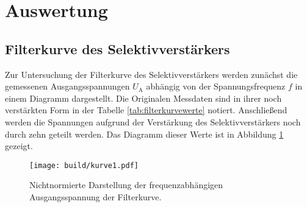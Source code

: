 \section{Auswertung}

\subsection{Filterkurve des Selektivverstärkers}

Zur Untersuchung der Filterkurve des Selektivverstärkers werden zunächst die gemessenen Ausgangsspannungen $U_{\text{A}}$ abhängig von der Spannungsfrequenz $f$ in einem Diagramm dargestellt.  Die Originalen Messdaten sind in ihrer noch verstärkten Form in der Tabelle \ref{tab:filterkurvewerte} notiert.
Anschließend werden die Spannungen aufgrund der Verstärkung des Selektivverstärkers noch durch zehn geteilt werden.
Das Diagramm dieser Werte ist in Abbildung \ref{fig:kurve1} gezeigt.

\begin{figure}
    \centering
    \texttt{[image: build/kurve1.pdf]}
    \caption{Nichtnormierte Darstellung der frequenzabhängigen Ausgangsspannung der Filterkurve.} 
    \label{fig:kurve1}
\end{figure}

